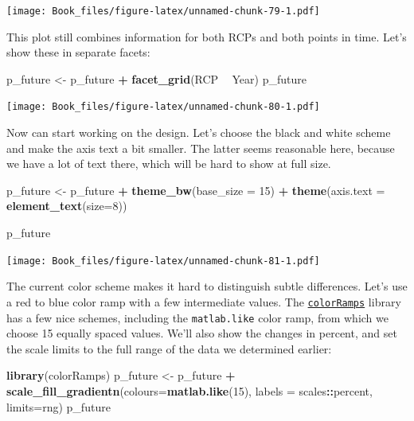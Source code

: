 \documentclass[
]{book}
\newenvironment{Shaded}{\begin{snugshade}}{\end{snugshade}}
\newcommand{\DataTypeTok}[1]{\textcolor[rgb]{0.13,0.29,0.53}{#1}}
\newcommand{\DecValTok}[1]{\textcolor[rgb]{0.00,0.00,0.81}{#1}}
\newcommand{\KeywordTok}[1]{\textcolor[rgb]{0.13,0.29,0.53}{\textbf{#1}}}
\newcommand{\NormalTok}[1]{#1}
\newcommand{\OperatorTok}[1]{\textcolor[rgb]{0.81,0.36,0.00}{\textbf{#1}}}
\newcommand{\StringTok}[1]{\textcolor[rgb]{0.31,0.60,0.02}{#1}}
\begin{document}
\texttt{[image: Book\_files/figure-latex/unnamed-chunk-79-1.pdf]}

This plot still combines information for both RCPs and both points in time. Let's show these in separate facets:

\begin{Shaded}
\begin{Highlighting}[]
\NormalTok{p_future <-}
\StringTok{  }\NormalTok{p_future }\OperatorTok{+}
\StringTok{  }\KeywordTok{facet_grid}\NormalTok{(RCP }\OperatorTok{~}\StringTok{ }\NormalTok{Year) }
\NormalTok{p_future}
\end{Highlighting}
\end{Shaded}

\texttt{[image: Book\_files/figure-latex/unnamed-chunk-80-1.pdf]}

Now can start working on the design. Let's choose the black and white scheme and make the axis text a bit smaller. The latter seems reasonable here, because we have a lot of text there, which will be hard to show at full size.

\begin{Shaded}
\begin{Highlighting}[]
\NormalTok{p_future <-}
\StringTok{  }\NormalTok{p_future }\OperatorTok{+}
\StringTok{  }\KeywordTok{theme_bw}\NormalTok{(}\DataTypeTok{base_size =} \DecValTok{15}\NormalTok{) }\OperatorTok{+}
\StringTok{  }\KeywordTok{theme}\NormalTok{(}\DataTypeTok{axis.text =} \KeywordTok{element_text}\NormalTok{(}\DataTypeTok{size=}\DecValTok{8}\NormalTok{))}

\NormalTok{p_future}
\end{Highlighting}
\end{Shaded}

\texttt{[image: Book\_files/figure-latex/unnamed-chunk-81-1.pdf]}

The current color scheme makes it hard to distinguish subtle differences. Let's use a red to blue color ramp with a few intermediate values. The \href{https://cran.r-project.org/web/packages/colorRamps/colorRamps.pdf}{\texttt{colorRamps}} library has a few nice schemes, including the \texttt{matlab.like} color ramp, from which we choose 15 equally spaced values. We'll also show the changes in percent, and set the scale limits to the full range of the data we determined earlier:

\begin{Shaded}
\begin{Highlighting}[]
\KeywordTok{library}\NormalTok{(colorRamps)}
\NormalTok{p_future <-}
\StringTok{  }\NormalTok{p_future }\OperatorTok{+}
\StringTok{  }\KeywordTok{scale_fill_gradientn}\NormalTok{(}\DataTypeTok{colours=}\KeywordTok{matlab.like}\NormalTok{(}\DecValTok{15}\NormalTok{),}
                       \DataTypeTok{labels =}\NormalTok{ scales}\OperatorTok{::}\NormalTok{percent,}
                       \DataTypeTok{limits=}\NormalTok{rng)}
\NormalTok{p_future}
\end{Highlighting}
\end{Shaded}
\end{document}
